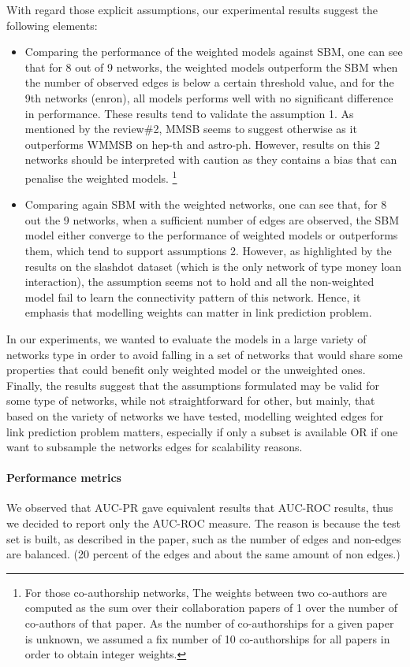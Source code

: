 \documentclass{article}
\begin{document}
With regard those explicit assumptions, our experimental results suggest the following elements:
\begin{itemize}
\item Comparing the performance of the weighted models against SBM, one can see that for 8 out of 9 networks, the weighted models outperform the SBM when the number of observed edges is below a certain threshold value, and for the 9th networks (enron), all models performs well with no significant difference in performance. These results tend to validate the assumption 1. As mentioned by the review\#2, MMSB seems to suggest otherwise as it outperforms WMMSB on hep-th and astro-ph. However, results on this 2 networks should be interpreted with caution as they contains a bias that can penalise the weighted models. \footnote{For those co-authorship networks, The weights between two co-authors are computed as the sum over their collaboration papers of 1 over the number of co-authors of that paper. As the number of co-authorships for a given paper is unknown, we assumed a fix number of 10 co-authorships for all papers in order to obtain integer weights.}
\item Comparing again SBM with the weighted networks, one can see that, for 8 out the 9 networks, when a sufficient number of edges are observed, the SBM model either converge to the performance of weighted models or outperforms them, which tend to support assumptions 2. However, as highlighted by the results on the slashdot dataset (which is the only network of type money loan interaction), the assumption seems not to hold and all the non-weighted model fail to learn the connectivity pattern of this network. Hence, it emphasis that modelling weights can matter in link prediction problem.
\end{itemize}

In our experiments, we wanted to evaluate the models in a large variety of networks type in order to avoid falling in a set of networks that would share some properties that could benefit only weighted model or the unweighted ones. Finally, the results suggest that the assumptions formulated may be valid for some type of networks, while not straightforward for other, but mainly, that based on the variety of networks we have tested, modelling weighted edges for link prediction problem matters, especially if only a subset is available OR if one want to subsample the networks edges for scalability reasons.


\paragraph{Performance metrics}  We observed that AUC-PR gave equivalent results that AUC-ROC results, thus we decided to report only the AUC-ROC measure. The reason is because the test set is built, as described in the paper, such as the number of edges and non-edges are balanced. (20 percent of the edges and about the same amount of non edges.)
\end{document}
